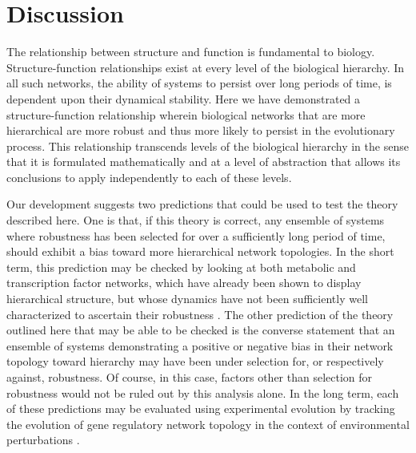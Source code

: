 

\section{Discussion}
The relationship between structure and function is fundamental to biology. Structure-function relationships exist at every level of the biological hierarchy. In all such networks, the ability of systems to persist over long periods of time, is dependent upon their dynamical stability. Here we have demonstrated a structure-function relationship wherein biological networks that are more hierarchical are more robust and thus more likely to persist in the evolutionary process. This relationship transcends levels of the biological hierarchy in the sense that it is formulated mathematically and at a level of abstraction that allows its conclusions to apply independently to each of these levels.

Our development suggests two predictions that could be used to test the theory described here. One is that, if this theory is correct, any ensemble of systems where robustness has been selected for over a sufficiently long period of time, should exhibit a bias toward more hierarchical network topologies. In the short term, this prediction may be checked by looking at both metabolic and transcription factor networks, which have already been shown to display hierarchical structure, but whose dynamics have not been sufficiently well characterized to ascertain their robustness \cite{Zhao2006,Bhardwaj2010,Colm}. The other prediction of the theory outlined here that may be able to be checked is the converse statement that an ensemble of systems demonstrating a positive or negative bias in their network topology toward hierarchy may have been under selection for, or respectively against, robustness. Of course, in this case, factors other than selection for robustness would not be ruled out by this analysis alone.  In the long term, each of these predictions may be evaluated using experimental evolution by tracking the evolution of gene regulatory network topology in the context of environmental perturbations \cite{Leroi1994}.

